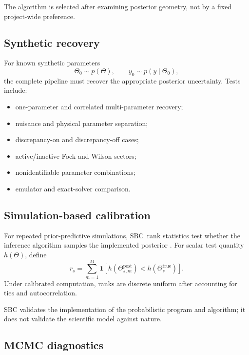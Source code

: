 \documentclass[11pt]{article}
\newcommand{\bbone}{\bm 1}
\newcommand{\post}{\mathrm{post}}
\newcommand{\SBC}{\ensuremath{\mathrm{SBC}}}
\begin{document}
The algorithm is selected after examining posterior geometry, not by a fixed
project-wide preference.

\subsection{Synthetic recovery}

For known synthetic parameters
\begin{equation}
 \Theta_0\sim p(\Theta),
 \qquad
 y_0\sim p(y\mid\Theta_0),
 \label{eq:synthetic-generation}
\end{equation}
the complete pipeline must recover the appropriate posterior uncertainty.
Tests include:
\begin{itemize}
\item one-parameter and correlated multi-parameter recovery;
\item nuisance and physical parameter separation;
\item discrepancy-on and discrepancy-off cases;
\item active/inactive Fock and Wilson sectors;
\item nonidentifiable parameter combinations;
\item emulator and exact-solver comparison.
\end{itemize}

\subsection{Simulation-based calibration}

For repeated prior-predictive simulations, \SBC\ rank statistics test whether
the inference algorithm samples the implemented posterior
\cite{Talts2018}.  For scalar test quantity \(h(\Theta)\), define
\begin{equation}
 r_s
 =
 \sum_{m=1}^{M}
 \bbone\!\left[
 h(\Theta_{s,m}^{\post})
 <
 h(\Theta_s^{\mathrm{true}})
 \right].
 \label{eq:sbc-rank}
\end{equation}
Under calibrated computation, ranks are discrete uniform after accounting for
ties and autocorrelation.

SBC validates the implementation of the probabilistic program and algorithm;
it does not validate the scientific model against nature.

\subsection{MCMC diagnostics}
\end{document}
